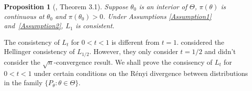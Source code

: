 \documentclass[11pt]{article}
\theoremstyle{plain}
\newtheorem{proposition}{\quad\quad Proposition}
\theoremstyle{definition}
\theoremstyle{remark}
\begin{document}
\begin{proposition}[\cite{Kleijn2012The}, Theorem 3.1]
    Suppose $\theta_0$ is an interior of $\Theta$, $\pi(\theta)$ is continuous at $\theta_0$ and $\pi(\theta_0)>0$.
    Under Assumptions \ref{Assumption1} and~\ref{Assumption2}, $L_1$ is consistent.
\end{proposition}





The consistency of $L_t$ for $0<t<1$ is different from $t=1$.
\cite{kar10563} considered the Hellinger consistency of $L_{1/2}$.
However, they only consider $t=1/2$ and didn't consider the $\sqrt{n}$-convergence result.
We shall prove the consisency of $L_{t}$ for $0<t<1$ under certain conditions on the R\'{e}nyi divergence between distributions in the family $\{P_\theta:\theta\in\Theta\}$.
\end{document}
